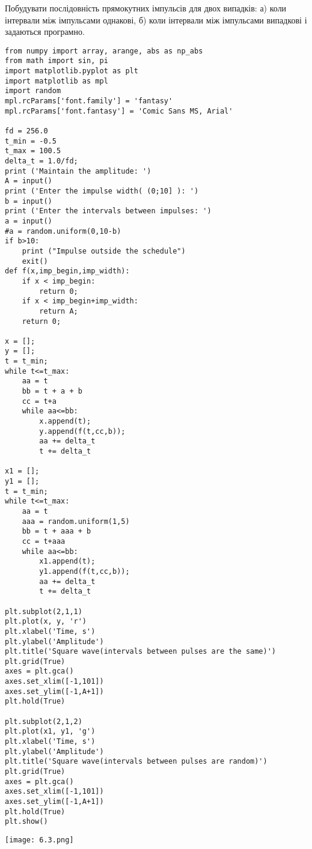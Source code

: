 \documentclass[a4paper,12pt]{article}
\begin{document}
 Побудувати послідовність прямокутних імпульсів для двох випадків: а) коли інтервали між імпульсами однакові, б) коли інтервали між імпульсами випадкові і задаються програмно.
\lstset{language=Python}
\begin{lstlisting}
from numpy import array, arange, abs as np_abs
from math import sin, pi
import matplotlib.pyplot as plt
import matplotlib as mpl
import random
mpl.rcParams['font.family'] = 'fantasy'
mpl.rcParams['font.fantasy'] = 'Comic Sans MS, Arial'

fd = 256.0
t_min = -0.5
t_max = 100.5
delta_t = 1.0/fd;
print ('Maintain the amplitude: ')
A = input()
print ('Enter the impulse width( (0;10] ): ')
b = input()
print ('Enter the intervals between impulses: ')
a = input()
#a = random.uniform(0,10-b)
if b>10:
	print ("Impulse outside the schedule")
	exit()
def f(x,imp_begin,imp_width):
    if x < imp_begin:
        return 0;
    if x < imp_begin+imp_width:
        return A;
    return 0;
    
x = [];
y = [];
t = t_min;
while t<=t_max:
    aa = t
    bb = t + a + b
    cc = t+a
    while aa<=bb:
        x.append(t);
        y.append(f(t,cc,b));
        aa += delta_t
        t += delta_t

x1 = [];
y1 = [];
t = t_min;
while t<=t_max:
    aa = t
    aaa = random.uniform(1,5)
    bb = t + aaa + b
    cc = t+aaa
    while aa<=bb:
        x1.append(t);
        y1.append(f(t,cc,b));
        aa += delta_t
        t += delta_t

plt.subplot(2,1,1)  
plt.plot(x, y, 'r')
plt.xlabel('Time, s')
plt.ylabel('Amplitude')
plt.title('Square wave(intervals between pulses are the same)')
plt.grid(True)
axes = plt.gca()
axes.set_xlim([-1,101])
axes.set_ylim([-1,A+1])
plt.hold(True)

plt.subplot(2,1,2)  
plt.plot(x1, y1, 'g')
plt.xlabel('Time, s')
plt.ylabel('Amplitude')
plt.title('Square wave(intervals between pulses are random)')
plt.grid(True)
axes = plt.gca()
axes.set_xlim([-1,101])
axes.set_ylim([-1,A+1])
plt.hold(True)
plt.show()
\end{lstlisting}
\begin{center}
\texttt{[image: 6.3.png]}
\end{center}
\end{document}
